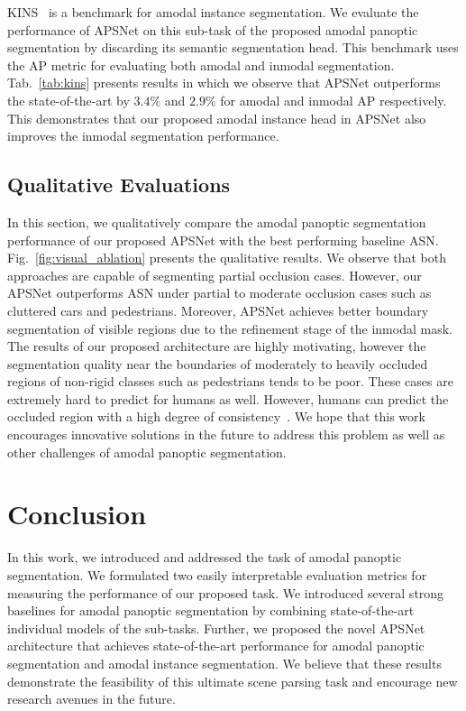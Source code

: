 \documentclass[10pt,twocolumn,letterpaper]{article}
\newcommand{\figref}[1]{Fig.~\ref{#1}}
\newcommand{\tabref}[1]{Tab.~\ref{#1}}
\begin{document}
KINS~\cite{qi2019amodal} is a benchmark for amodal instance segmentation. We evaluate the performance of \mbox{APSNet} on this sub-task of the proposed amodal panoptic segmentation by discarding its semantic segmentation head. This benchmark uses the AP metric for evaluating both amodal and inmodal segmentation. \tabref{tab:kins} presents results in which we observe that \mbox{APSNet} outperforms the state-of-the-art by $3.4\%$ and $2.9\%$ for amodal and inmodal AP respectively. This demonstrates that our proposed amodal instance head in \mbox{APSNet} also improves the inmodal segmentation performance.

\subsection{Qualitative Evaluations}
\label{sec:qualitative}

In this section, we qualitatively compare the amodal panoptic segmentation performance of our proposed \mbox{APSNet} with the best performing baseline ASN. \figref{fig:visual_ablation} presents the qualitative results. We observe that both approaches are capable of segmenting partial occlusion cases. However, our \mbox{APSNet} outperforms ASN under partial to moderate occlusion cases such as cluttered cars and pedestrians. Moreover, \mbox{APSNet} achieves better boundary segmentation of visible regions due to the refinement stage of the inmodal mask. The results of our proposed architecture are highly motivating, however the segmentation quality near the boundaries of moderately to heavily occluded regions of non-rigid classes such as pedestrians tends to be poor. These cases are extremely hard to predict for humans as well. However, humans can predict the occluded region with a high degree of consistency~\cite{zhu2017semantic}. We hope that this work encourages innovative solutions in the future to address this problem as well as other challenges of amodal panoptic segmentation.






 
\section{Conclusion}
In this work, we introduced and addressed the task of amodal panoptic segmentation. We formulated two easily interpretable evaluation metrics for measuring the performance of our proposed task. We introduced several strong baselines for amodal panoptic segmentation by combining state-of-the-art individual models of the sub-tasks. Further, we proposed the novel \mbox{APSNet} architecture that achieves state-of-the-art performance for amodal panoptic segmentation and amodal instance segmentation. We believe that these results demonstrate the feasibility of this ultimate scene parsing task and encourage new research avenues in the future. 
\end{document}

